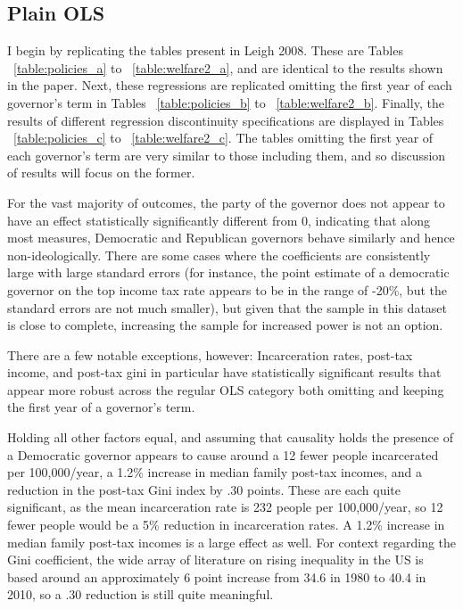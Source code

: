 \documentclass{article}
\begin{document}
\subsection{Plain OLS}

I begin by replicating the tables present in Leigh 2008. These are Tables ~\ref{table:policies_a} to ~\ref{table:welfare2_a}, and are identical to the results shown in the paper. Next, these regressions are replicated omitting the first year of each governor's term in Tables  ~\ref{table:policies_b} to ~\ref{table:welfare2_b}. Finally, the results of different regression discontinuity specifications are displayed in Tables  ~\ref{table:policies_c} to ~\ref{table:welfare2_c}. The tables omitting the first year of each governor's term are very similar to those including them, and so discussion of results will focus on the former.

For the vast majority of outcomes, the party of the governor does not appear to have an effect statistically significantly different from 0, indicating that along most measures, Democratic and Republican governors behave similarly and hence non-ideologically. There are some cases where the coefficients are consistently large with large standard errors (for instance, the point estimate of a democratic governor on the top income tax rate appears to be in the range of -20\%, but the standard errors are not much smaller), but given that the sample in this dataset is close to complete, increasing the sample for increased power is not an option.

There are a few notable exceptions, however: Incarceration rates, post-tax income, and post-tax gini in particular have statistically significant results that appear more robust across the regular OLS category both omitting and keeping the first year of a governor's term. 

Holding all other factors equal, and assuming that causality holds the presence of a Democratic governor appears to cause around a 12 fewer people incarcerated per 100,000/year, a 1.2\% increase in median family post-tax incomes, and a reduction in the post-tax Gini index by .30 points. These are each quite significant, as the mean incarceration rate is 232 people per 100,000/year, so 12 fewer people would be a 5\% reduction in incarceration rates. A 1.2\% increase in median family post-tax incomes is a large effect as well. For context regarding the Gini coefficient, the wide array of literature on rising inequality in the US is based around an approximately 6 point increase from 34.6 in 1980 to 40.4 in 2010, so a .30 reduction is still quite meaningful.
\end{document}
